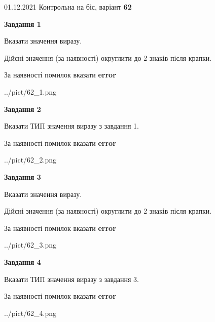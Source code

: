 \documentclass[11pt, ukrainian]{article}
\begin{document}
{01.12.2021 Контрольна на біс, варіант  \No \textbf { 62 }\par}
{
\begin {large}
{\begin {center}\textbf{Завдання 1}\end {center}}\par
Вказати значення виразу. \par
Дійсні значення (за наявності) округлити до 2 знаків після крапки. \par
За наявності помилок вказати \textbf{error}

\begin{center}
	{../pict/62_1.png}
\end{center}
\newpage

{\begin {center}\textbf{Завдання 2}\end {center}}\par
Вказати ТИП значення виразу з завдання 1. \par
За наявності помилок вказати \textbf{error}

\begin{center}
	{../pict/62_2.png}
\end{center}
\newpage

{\begin {center}\textbf{Завдання 3}\end {center}}\par
Вказати значення виразу. \par
Дійсні значення (за наявності) округлити до 2 знаків після крапки. \par
За наявності помилок вказати \textbf{error}

\begin{center}
	{../pict/62_3.png}
\end{center}
\newpage

{\begin {center}\textbf{Завдання 4}\end {center}}\par
Вказати ТИП значення виразу з завдання 3. \par
За наявності помилок вказати \textbf{error}

\begin{center}
	{../pict/62_4.png}
\end{center}
\newpage


\end{large}}
\end{document}
